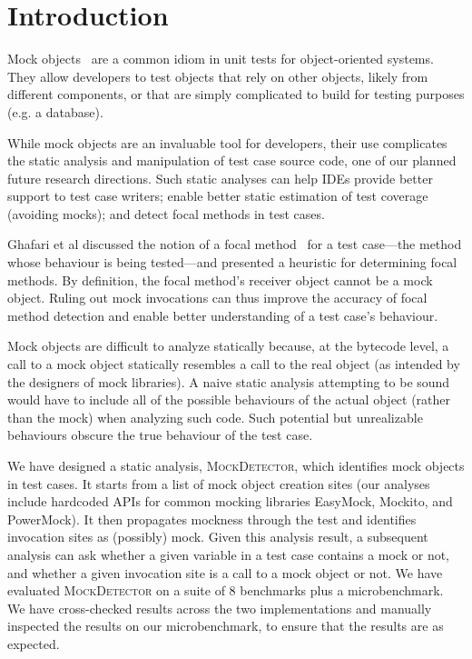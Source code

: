 \chapter{Introduction}
\label{chap:introduction}
\doublespacing

Mock objects~\cite{beck02:_test_driven_devel} are a common idiom in
unit tests for object-oriented systems.  They allow developers to test objects that 
rely on other objects, likely from different components, or that are simply complicated 
to build for testing purposes (e.g. a database).

While mock objects are an invaluable tool for developers, their use
complicates the static analysis and manipulation of test case source code, one of our planned future
research directions. Such static analyses can help IDEs provide better
support to test case writers; enable better static estimation of test coverage
(avoiding mocks); and detect focal methods in test cases.

Ghafari et al discussed the notion of a focal method~\cite{ghafari15:_autom} for a test case---the method
whose behaviour is being tested---and presented a heuristic for determining focal methods.
By definition, the focal method's receiver object cannot be a mock object.
Ruling out mock invocations can thus improve the accuracy of focal method detection and
enable better understanding of a test case's behaviour.

Mock objects are difficult to analyze statically because, at the bytecode level,
a call to a mock object statically resembles a call to the real object (as
intended by the designers of mock libraries).
A naive static analysis attempting to be sound would have to include all of 
the possible behaviours of the actual object (rather than the mock) when analyzing such code. 
Such potential but unrealizable behaviours obscure the true behaviour 
of the test case.

We have designed a static analysis, \textsc{MockDetector}, which identifies
mock objects in test cases. It starts from a list of mock object creation sites
(our analyses include hardcoded APIs for common mocking libraries EasyMock, Mockito, and PowerMock). 
It then propagates mockness
through the test and identifies invocation sites as (possibly) mock.
Given this analysis result, a subsequent analysis
can ask whether a given variable in a test case contains a mock or not, and
whether a given invocation site is a call to a mock object or not. We have
evaluated \textsc{MockDetector} on a suite of 8 benchmarks plus a microbenchmark. 
We have cross-checked results across the two implementations and manually inspected
the results on our microbenchmark, to ensure that the results are as expected.

